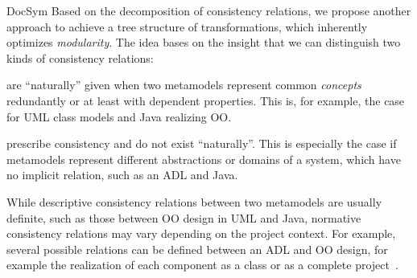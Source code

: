 \begin{copiedFrom}{DocSym}
Based on the decomposition of consistency relations, we propose another approach to achieve a tree structure of transformations, which inherently optimizes \emph{modularity}.
The idea bases on the insight that we can distinguish two kinds of consistency relations:
\begin{description}[leftmargin=\parindent]
    \item[Descriptive consistency relations] are \enquote{naturally} given when two metamodels represent common \emph{concepts} %
    redundantly or at least with dependent properties. This is, for example, the case for \ac{UML} class models and Java realizing \ac{OO}. %
    \item[Normative consistency relations] prescribe consistency and %
    do not exist \enquote{naturally}. This is especially the case if metamodels represent different abstractions or domains of a system, which have no implicit relation, such as an \ac{ADL} and Java. %
\end{description}

While descriptive consistency relations between two metamodels are usually definite, such as those between \ac{OO} design in \ac{UML} and Java, normative consistency relations may vary depending on the project context.
For example, several possible relations can be defined between an \ac{ADL} and \ac{OO} design, for example the realization of each component as a class or as a complete project~\cite{langhammer2017a}.


\end{copiedFrom}

